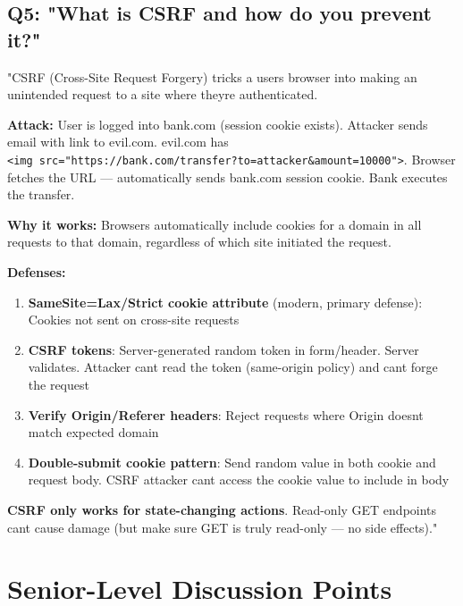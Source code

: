 \documentclass[11pt]{article}
\providecommand{\tightlist}{\setlength{\itemsep}{1pt}\setlength{\parskip}{0pt}}
\begin{document}
\subsection{Q5: "What is CSRF and how do you prevent it?"}\label{q5-what-is-csrf-and-how-do-you-prevent-it}

"CSRF (Cross-Site Request Forgery) tricks a user\textquotesingle s browser into making an unintended request to a site where they\textquotesingle re authenticated.

\textbf{Attack:} User is logged into bank.com (session cookie exists). Attacker sends email with link to evil.com. evil.com has \texttt{\textless{}img\ src="https://bank.com/transfer?to=attacker\&amount=10000"\textgreater{}}. Browser fetches the URL --- automatically sends bank.com session cookie. Bank executes the transfer.

\textbf{Why it works:} Browsers automatically include cookies for a domain in all requests to that domain, regardless of which site initiated the request.

\textbf{Defenses:}

\begin{enumerate}
\def\labelenumi{\arabic{enumi}.}
\tightlist
\item
  \textbf{SameSite=Lax/Strict cookie attribute} (modern, primary defense): Cookies not sent on cross-site requests
\item
  \textbf{CSRF tokens}: Server-generated random token in form/header. Server validates. Attacker can\textquotesingle t read the token (same-origin policy) and can\textquotesingle t forge the request
\item
  \textbf{Verify Origin/Referer headers}: Reject requests where Origin doesn\textquotesingle t match expected domain
\item
  \textbf{Double-submit cookie pattern}: Send random value in both cookie and request body. CSRF attacker can\textquotesingle t access the cookie value to include in body
\end{enumerate}

\textbf{CSRF only works for state-changing actions}. Read-only GET endpoints can\textquotesingle t cause damage (but make sure GET is truly read-only --- no side effects)."

\section{Senior-Level Discussion Points}\label{senior-level-discussion-points}
\end{document}
